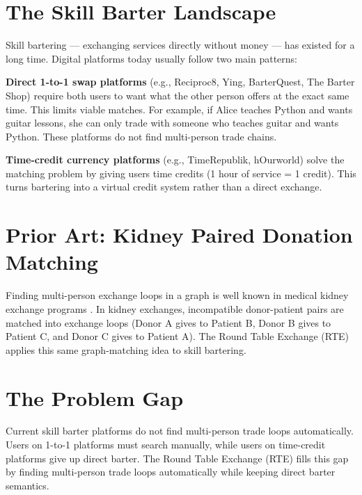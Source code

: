 \section{The Skill Barter Landscape}

Skill bartering --- exchanging services directly without money --- has existed for a long time. Digital platforms today usually follow two main patterns:

\textbf{Direct 1-to-1 swap platforms} (e.g., Reciproc8, Ying, BarterQuest, The Barter Shop) require both users to want what the other person offers at the exact same time. This limits viable matches. For example, if Alice teaches Python and wants guitar lessons, she can only trade with someone who teaches guitar and wants Python. These platforms do not find multi-person trade chains.

\textbf{Time-credit currency platforms} (e.g., TimeRepublik, hOurworld) solve the matching problem by giving users time credits (1 hour of service = 1 credit). This turns bartering into a virtual credit system rather than a direct exchange.

\section{Prior Art: Kidney Paired Donation Matching}

Finding multi-person exchange loops in a graph is well known in medical kidney exchange programs \cite{roth2004kidney, ashlagi2013kidney}. In kidney exchanges, incompatible donor-patient pairs are matched into exchange loops (Donor A gives to Patient B, Donor B gives to Patient C, and Donor C gives to Patient A). The Round Table Exchange (RTE) applies this same graph-matching idea to skill bartering.

\section{The Problem Gap}

Current skill barter platforms do not find multi-person trade loops automatically. Users on 1-to-1 platforms must search manually, while users on time-credit platforms give up direct barter. The Round Table Exchange (RTE) fills this gap by finding multi-person trade loops automatically while keeping direct barter semantics.